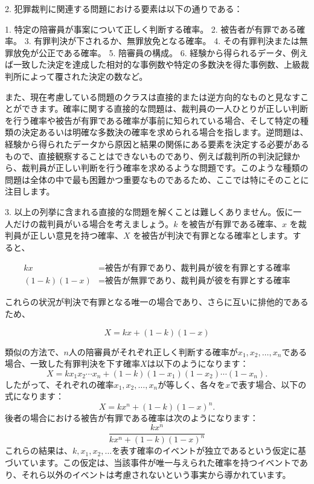 \documentclass[a4paper,11pt,openany]{ltjsbook}
\begin{document}
2. 犯罪裁判に関連する問題における要素は以下の通りである：

1. 特定の陪審員が事案について正しく判断する確率。
2. 被告者が有罪である確率。
3. 有罪判決が下されるか、無罪放免となる確率。
4. その有罪判決または無罪放免が公正である確率。
5. 陪審員の構成。
6. 経験から得られるデータ、例えば一致した決定を達成した相対的な事例数や特定の多数決を得た事例数、上級裁判所によって覆された決定の数など。

また、現在考慮している問題のクラスは直接的または逆方向的なものと見なすことができます。確率に関する直接的な問題は、裁判員の一人ひとりが正しい判断を行う確率や被告が有罪である確率が事前に知られている場合、そして特定の種類の決定あるいは明確な多数決の確率を求められる場合を指します。逆問題は、経験から得られたデータから原因と結果の関係にある要素を決定する必要があるもので、直接観察することはできないものであり、例えば裁判所の判決記録から、裁判員が正しい判断を行う確率を求めるような問題です。このような種類の問題は全体の中で最も困難かつ重要なものであるため、ここでは特にそのことに注目します。

3. 以上の列挙に含まれる直接的な問題を解くことは難しくありません。仮に一人だけの裁判員がいる場合を考えましょう。$k$ を被告が有罪である確率、$x$ を裁判員が正しい意見を持つ確率、$X$ を被告が判決で有罪となる確率とします。すると、

\begin{align*}
  kx &= \text{被告が有罪であり、裁判員が彼を有罪とする確率}\\
  (1-k)(1-x) &= \text{被告が無罪であり、裁判員が彼を有罪とする確率}
\end{align*}

これらの状況が判決で有罪となる唯一の場合であり、さらに互いに排他的であるため、

\[
  X = kx + (1-k)(1-x) \tag{1}
\]

類似の方法で、$n$人の陪審員がそれぞれ正しく判断する確率が$x_1, x_2, \dotsc, x_n$である場合、一致した有罪判決を下す確率$X$は以下のようになります：
\[
  X = k x_1 x_2 \dotsm x_n + (1-k)(1-x_1)(1-x_2) \dotsm (1-x_n).
\]
したがって、それぞれの確率$x_1, x_2, \dotsc, x_n$が等しく、各々を$x$で表す場合、以下の式になります：
\[
  X = kx^n + (1-k)(1-x)^n.   \tag{2}
\]
後者の場合における被告が有罪である確率は次のようになります：
\[
  \frac{kx^n}{kx^n + (1-k)(1-x)^n}
\]
これらの結果は、$k, x_1, x_2, \dotsc$を表す確率のイベントが独立であるという仮定に基づいています。この仮定は、当該事件が唯一与えられた確率を持つイベントであり、それら以外のイベントは考慮されないという事実から導かれています。
\end{document}
